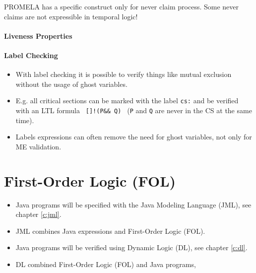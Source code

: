 					PROMELA has a specific construct only for never claim process. Some never claims are not expressible in temporal logic!

			\subsubsection{Liveness Properties} %

			\subsubsection{Label Checking}
				\begin{itemize}
					\item With label checking it is possible to verify things like mutual exclusion without the usage of ghost variables.
					\item E.g. all critical sections can be marked with the label \texttt{cs:} and be verified with an LTL formula \texttt{ []!(P\@cs \&\& Q\@cs) } (\texttt{P} and \texttt{Q} are never in the CS at the same time).
					\item Labels expressions can often remove the need for ghost variables, not only for ME validation.
				\end{itemize}
	

\chapter{First-Order Logic (FOL)}
	\begin{itemize}
		\item Java programs will be specified with the Java Modeling Language (JML), see chapter \ref{c:jml}.
		\item JML combines Java expressions and First-Order Logic (FOL).
		\item Java programs will be verified using Dynamic Logic (DL), see chapter \ref{c:dl}.
		\item DL combined First-Order Logic (FOL) and Java programs,
	\end{itemize}

